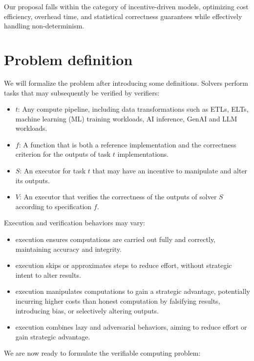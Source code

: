 \documentclass[sigconf, nonacm]{acmart}
\begin{document}
Our proposal falls within the category of incentive-driven models, optimizing cost efficiency, overhead time, and statistical correctness guarantees while effectively handling non-determinism.%

\section{Problem definition}
\label{sec:problemdef}
We will formalize the problem after introducing some definitions.
Solvers perform tasks that may subsequently be verified by verifiers:

\begin{itemize}
  \item {} $t$: Any compute pipeline, including data transformations such as ETLs, ELTs, machine learning (ML) training workloads, AI inference, GenAI and LLM workloads.
  \item {} $f$: A function that is both a reference implementation and the correctness criterion for the outputs of task $t$ implementations.
  \item {} $S$: An executor for task $t$ that may have an incentive to manipulate and alter its outputs.
  \item {} $V$: An executor that verifies the correctness of the outputs of solver $S$ according to specification $f$.
\end{itemize}

Execution and verification behaviors may vary:

\begin{itemize}
  \item {} execution ensures computations are carried out fully and correctly, maintaining accuracy and integrity.
  \item {} execution skips or approximates steps to reduce effort, without strategic intent to alter results.
  \item {} execution manipulates computations to gain a strategic advantage, potentially incurring higher costs than honest computation by falsifying results, introducing bias, or selectively altering outputs.
  \item {} execution combines lazy and adversarial behaviors, aiming to reduce effort or gain strategic advantage.
\end{itemize}

We are now ready to formulate the verifiable computing problem:
\end{document}
